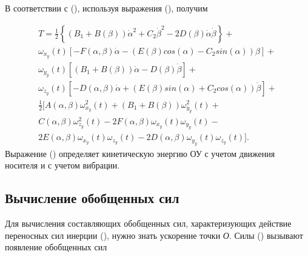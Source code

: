 В соответствии с (), используя выражения (), получим

\begin{equation} %
\label{eq:p3:28}
\begin{multlined}
T=\frac{1}{2} 
\left\lbrace 
	( B_{1}+B ( \beta ) ) \dot{\alpha}^{2}+
	C_{2} \dot{\beta} ^{2} - 
	2D ( \beta ) \dot{\alpha} \dot{\beta} 
\right\rbrace + \\ 
\omega_{x_{y}} ( t ) 
[ 
	-F ( \alpha, \beta ) \dot{\alpha} - 
	(
		E ( \beta ) cos ( \alpha ) -
		C_{2}sin ( \alpha ) 
	) \beta 
] + \\
\omega_{y_{y}} ( t ) 
[ 
	( B_{1}+B ( \beta ) ) \dot{\alpha} -
	D ( \beta ) \dot{\beta} 
] + \\
\omega_{z_{y}} ( t ) 
[ 
	-D ( \alpha, \beta ) \dot{\alpha} + 
	( E ( \beta ) sin ( \alpha ) +C_{2}cos ( \alpha ) ) \dot{\beta} 
] + \\
\frac{1}{2} 
[
	A ( \alpha, \beta ) \omega_{x_{y}}^{2} ( t ) + 
	( B_{1}+B ( \beta ) ) \omega_{y_{y}}^{2} ( t ) + \\
	C ( \alpha, \beta ) \omega_{z_{y}}^{2} ( t ) - 
	2F ( \alpha, \beta ) \omega_{x_{y}} ( t ) \omega_{y_{y}} ( t ) - \\
	2E ( \alpha, \beta ) \omega_{x_{y}} ( t ) \omega_{z_{y}} ( t ) -
	2D ( \alpha, \beta ) \omega_{y_{y}} ( t ) \omega_{z_{y}} ( t ) 
].
\end{multlined}
\end{equation}
Выражение () определяет кинетическую энергию ОУ с учетом движения носителя и с учетом вибрации. 

\subsection{Вычисление обобщенных сил} \label{sec:ch3/sec7}

Для вычисления составляющих обобщенных сил, характеризующих действие переносных сил инерции (), нужно знать ускорение точки \textit{О}. Силы () вызывают появление обобщенных сил 

